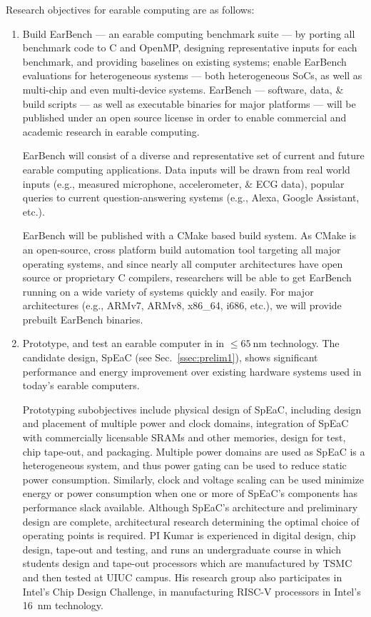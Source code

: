 Research objectives for earable computing are as follows:

\begin{enumerate}
\item Build EarBench --- an earable computing benchmark suite --- by porting
    all benchmark code to C and OpenMP, designing representative inputs for
    each benchmark, and providing baselines on existing systems; enable
    EarBench evaluations for heterogeneous systems --- both heterogeneous
    SoCs, as well as multi-chip and even multi-device systems.  EarBench
    --- software, data, \& build scripts --- as well as executable binaries
    for major platforms --- will be published under an open source license in
    order to enable commercial and academic research in earable computing.

    EarBench will consist of a diverse and representative set of current and
    future earable computing applications.  Data inputs will be drawn from
    real world inputs (e.g., measured microphone, accelerometer, \& ECG data),
    popular queries to current question-answering systems (e.g., Alexa,
    Google Assistant, etc.).

    EarBench will be published with a CMake based build system.  As CMake
    is an open-source, cross platform build automation tool targeting all
    major operating systems, and since nearly all computer architectures
    have open source or proprietary C compilers, researchers will be able
    to get EarBench running on a wide variety of systems quickly and easily.
    For major architectures (e.g., ARMv7, ARMv8, x86\_64, i686, etc.),
    we will provide prebuilt EarBench binaries.
    
\item
    Prototype, and test an earable computer in in \(\leq
    \SI{65}{\nano\meter}\) technology.
    The candidate design, SpEaC (see Sec.~\ref{ssec:prelim1}), shows
    significant performance and energy improvement over existing hardware
    systems used in today's earable computers.

    Prototyping subobjectives include physical design of SpEaC, including
        design and placement of multiple power and clock domains, integration
        of SpEaC with commercially licensable SRAMs and other memories, design
        for test, chip tape-out, and packaging.  Multiple power domains are
        used as SpEaC is a heterogeneous system, and thus power gating can be
        used to reduce static power consumption. Similarly, clock and voltage
        scaling can be used minimize energy or power consumption when one or
        more of SpEaC's components has performance slack available.  Although
        SpEaC's architecture and preliminary design are complete, architectural
        research determining the optimal choice of operating points is
        required.  PI Kumar is experienced in digital design, chip design,
        tape-out and testing, and runs an undergraduate course in which
        students design and tape-out processors which are manufactured by TSMC
        and then tested at UIUC campus.  His research group also participates
        in Intel's Chip Design Challenge, in manufacturing RISC-V processors in
        Intel's \SI{16}{\nano\meter} technology.


\end{enumerate}
